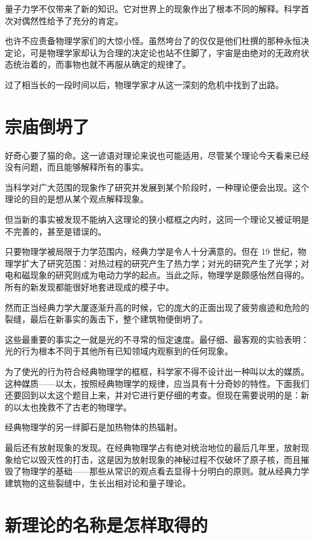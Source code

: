 量子力学不仅带来了新的知识。它对世界上的现象作出了根本不同的解释。科学首次对偶然性给予了充分的肯定。

也许不应责备物理学家们的大惊小怪。虽然垮台了的仅仅是他们杜撰的那种永恒决定论，可是物理学家却认为合理的决定论也站不住脚了，宇宙是由绝对的无政府状态统治着的，而事物也就不再服从确定的规律了。

过了相当长的一段时间以后，物理学家才从这一深刻的危机中找到了出路。

\section{宗庙倒坍了}

好奇心要了猫的命。这一谚语对理论来说也可能适用，尽管某个理论今天看来已经没有问题，而且能够解释所有的事实。

当科学对广大范围的现象作了研究并发展到某个阶段时，一种理论便会出现。这个理论的目的是想从某个观点解释现象。

但当新的事实被发现不能纳入这理论的狭小框框之内时，这同一个理论又被证明是不完善的，甚至是错误的。

只要物理学被局限于力学范围内，经典力学是令人十分满意的。但在 19 世纪，物理学扩大了研究范围：对热过程的研究产生了热力学；对光的研究产生了光学；对电和磁现象的研究则成为电动力学的起点。当此之际，物理学是颇感怡然自得的。所有的新发现都能很好地套进现成的模子中。

然而正当经典力学大厦逐渐升高的时候，它的庞大的正面出现了疲劳痕迹和危险的裂缝，最后在新事实的轰击下，整个建筑物便倒坍了。

这些最重要的事实之一就是光的不寻常的恒定速度。最仔细、最客观的实验表明：光的行为根本不同于其他所有已知领域内观察到的任何现象。

为了使光的行为符合经典物理学的框框，科学家不得不设计出一种叫以太的媒质。这种媒质——以太，按照经典物理学的规律，应当具有十分奇妙的特性。下面我们还要回到以太这个题目上来，并对它进行更仔细的考查。但现在需要说明的是：新的以太也挽救不了古老的物理学。

经典物理学的另一绊脚石是加热物体的热辐射。

最后还有放射现象的发现。在经典物理学占有绝对统治地位的最后几年里，放射现象给它以毁灭性的打击，这是因为放射现象的神秘过程不仅破坏了原子核，而且摧毁了物理学的基础——那些从常识的观点看去显得十分明白的原则。就从经典力学建筑物的这些裂缝中，生长出相对论和量子理论。

\section{新理论的名称是怎样取得的}


